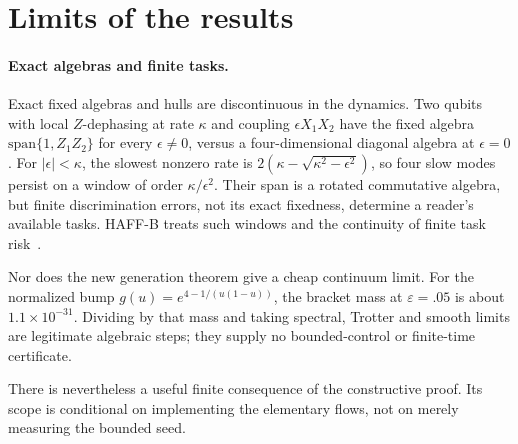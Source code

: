 \documentclass[12pt]{article}
\theoremstyle{definition}
\theoremstyle{remark}
\begin{document}
\section{Limits of the results}\label{sec:limits}

\paragraph{Exact algebras and finite tasks.} Exact fixed algebras and hulls
are discontinuous in the dynamics. Two qubits with local \(Z\)-dephasing at
rate \(\kappa\) and coupling \(\epsilon X_1X_2\) have the fixed algebra
\(\mathrm{span}\{1,Z_1Z_2\}\) for every \(\epsilon\ne0\), versus a
four-dimensional diagonal algebra at \(\epsilon=0\).
For \(|\epsilon|<\kappa\), the slowest nonzero rate is
\(2(\kappa-\sqrt{\kappa^2-\epsilon^2})\), so four slow modes persist on a
window of order \(\kappa/\epsilon^2\). Their span is a rotated commutative
algebra, but finite discrimination errors, not its exact fixedness, determine
a reader's available tasks. HAFF-B treats such windows and the continuity of
finite task risk~\cite{PaperB}.

Nor does the new generation theorem give a cheap continuum limit.
For the normalized bump \(g(u)=e^{4-1/(u(1-u))}\), the bracket mass at
\(\varepsilon=.05\) is about \(1.1\times10^{-31}\). Dividing by that mass and
taking spectral, Trotter and smooth limits are legitimate algebraic steps;
they supply no bounded-control or finite-time certificate.

There is nevertheless a useful finite consequence of the constructive proof.
Its scope is conditional on implementing the elementary flows, not on merely
measuring the bounded seed.
\end{document}
